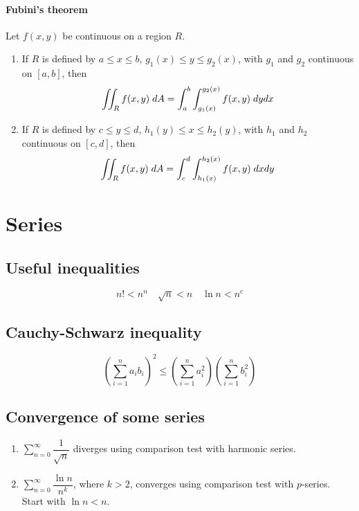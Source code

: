 \documentclass[a4paper]{article}
\begin{document}
\begin{multicols*}{3}
      \paragraph{Fubini's theorem}
        Let $f(x,y)$ be continuous on a region $R$.
        \begin{enumerate}
          \item If $R$ is defined by $a \leq x \leq b$, $g_1(x) \leq y \leq g_2(x)$, with $g_1$ and $g_2$ continuous on $[a,b]$, then
            \begin{equation*}
              \iint_{R} f(x,y) \; dA = \int_{a}^{b} \int_{g_1(x)}^{g_2(x)} f(x,y) \; dy dx
            \end{equation*}
          \item If $R$ is defined by $c \leq y \leq d$, $h_1(y) \leq x \leq h_2(y)$, with $h_1$ and $h_2$ continuous on $[c,d]$, then
            \begin{equation*}
              \iint_{R} f(x,y) \; dA = \int_{c}^{d} \int_{h_1(x)}^{h_2(x)} f(x,y) \; dx dy
            \end{equation*}
        \end{enumerate}
  \section*{Series}
    \subsection*{Useful inequalities}
      \begin{equation*}
        n! < n^n \quad
        \sqrt{n} < n \quad
        \ln n < n^c
      \end{equation*}
    \subsection*{Cauchy-Schwarz inequality}
      \begin{equation*}
        \left( \sum_{i=1}^n a_i b_i \right)^2 \leq \left(\sum_{i=1}^n a_i^2\right) \left(\sum_{i=1}^n b_i^2\right)
      \end{equation*}
    \subsection*{Convergence of some series}
      \begin{enumerate}
        \item $\displaystyle \sum_{n=0}^\infty \dfrac{1}{\sqrt{n}}$ diverges using comparison test with harmonic series.
        \item $\displaystyle \sum_{n=0}^\infty \dfrac{\ln n}{n^k}$, where $k>2$, converges using comparison test with $p$-series. Start with $\ln n < n$.
      \end{enumerate}

\end{multicols*}
\end{document}
